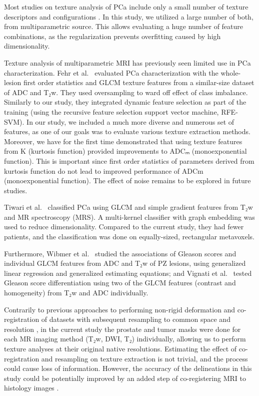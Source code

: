 \documentclass[10pt,letterpaper]{article}
\newcommand{\citep}{\cite}
\begin{document}
Most studies on texture analysis of PCa include only a small number of texture
descriptors and configurations \citep{Kwak2015, Viswanath2012, Ginsburg2014}. In
this study, we utilized a large number of both, from multiparametric source.
This allows evaluating a huge number of feature combinations, as the
regularization prevents overfitting caused by high dimensionality.

Texture analysis of multiparametric MRI has previously seen limited use in PCa
characterization. Fehr et al.\ \cite{Fehr2015} evaluated PCa characterization
with the whole-lesion first order statistics and GLCM texture features from a
similar-size dataset of ADC and T₂w. They used oversampling to ward off effect
of class imbalance. Similarly to our study, they integrated dynamic feature
selection as part of the training (using the recursive feature selection support
vector machine, RFE-SVM). In our study, we included a much more diverse and
numerous set of features, as one of our goals was to evaluate various texture
extraction methods. Moreover, we have for the first time demonstrated that using
texture features from K (kurtosis function) provided improvements to ADCₘ
(monoexponential function). This is important since first order statistics of
parameters derived from kurtosis function do not lead to improved performance of
ADCm (monoexponential function). The effect of noise remains to be explored in
future studies.

Tiwari et al.\ \cite{Tiwari2013} classified PCa using GLCM and simple gradient
features from T₂w and MR spectroscopy (MRS). A multi-kernel classifier with
graph embedding was used to reduce dimensionality. Compared to the current
study, they had fewer patients, and the classification was done on
equally-sized, rectangular metavoxels.

Furthermore, Wibmer et al.\ \cite{Wibmer2015} studied the associations of
Gleason scores and individual GLCM features from ADC and T₂w of PZ lesions,
using generalized linear regression and generalized estimating equations; and
Vignati et al.\ \cite{Vignati2015} tested Gleason score differentiation using
two of the GLCM features (contrast and homogeneity) from T₂w and ADC
individually.

Contrarily to previous approaches to performing non-rigid deformation and
co-registration of datasets with subsequent resampling to common space and
resolution \citep{Viswanath2012, Ginsburg2014}, in the current study the
prostate and tumor masks were done for each MR imaging method (T₂w, DWI, T₂)
individually, allowing us to perform texture analyses at their original native
resolutions. Estimating the effect of co-registration and resampling on texture
extraction is not trivial, and the process could cause loss of information.
However, the accuracy of the delineations in this study could be potentially
improved by an added step of co-registering MRI to histology images
\citep{Bourne2017}.
\end{document}
